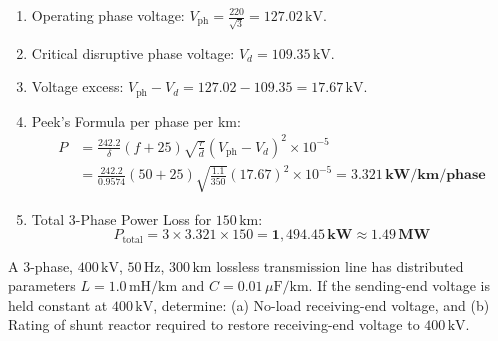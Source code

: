 \documentclass[11pt,a4paper]{article}
\newenvironment{Problem}[1][Numerical Problem]{\begin{tcolorbox}[problembox, title=#1]}{\end{tcolorbox}}
\newenvironment{Solution}[1][Step-by-Step Solution]{\begin{tcolorbox}[solbox, title=#1]}{\end{tcolorbox}}
\begin{document}
\begin{Solution}
\begin{enumerate}
  \item Operating phase voltage: $V_{\text{ph}} = \frac{220}{\sqrt{3}} = 127.02\,\text{kV}$.
  \item Critical disruptive phase voltage: $V_d = 109.35\,\text{kV}$.
  \item Voltage excess: $V_{\text{ph}} - V_d = 127.02 - 109.35 = 17.67\,\text{kV}$.
  \item Peek's Formula per phase per km:
    \begin{align*}
      P &= \frac{242.2}{\delta} (f + 25) \sqrt{\frac{r}{d}} (V_{\text{ph}} - V_d)^2 \times 10^{-5} \\
        &= \frac{242.2}{0.9574} (50 + 25) \sqrt{\frac{1.1}{350}} (17.67)^2 \times 10^{-5} = \mathbf{3.321\,\text{kW/km/phase}}
    \end{align*}
  \item Total 3-Phase Power Loss for $150\,\text{km}$:
    \begin{equation*}
      P_{\text{total}} = 3 \times 3.321 \times 150 = \mathbf{1,494.45\,\text{kW}} \approx \mathbf{1.49\,\text{MW}}
    \end{equation*}
\end{enumerate}
\end{Solution}

\begin{Problem}[Problem 12: Ferranti Rise on an Unloaded Long Transmission Line]
A 3-phase, $400\,\text{kV}$, $50\,\text{Hz}$, $300\,\text{km}$ lossless transmission line has distributed parameters $L = 1.0\,\text{mH/km}$ and $C = 0.01\,\mu\text{F/km}$. If the sending-end voltage is held constant at $400\,\text{kV}$, determine: (a) No-load receiving-end voltage, and (b) Rating of shunt reactor required to restore receiving-end voltage to $400\,\text{kV}$.
\end{Problem}
\end{document}
